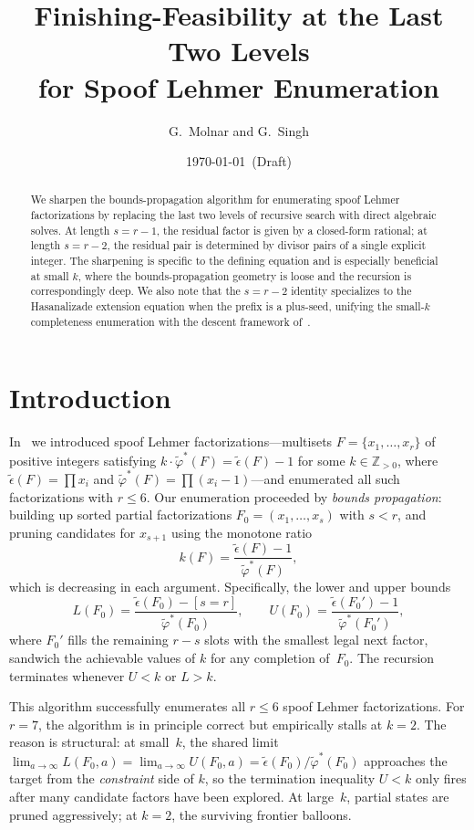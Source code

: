 \documentclass[11pt]{article}
\title{Finishing-Feasibility at the Last Two Levels\\
for Spoof Lehmer Enumeration}
\author{G.~Molnar and G.~Singh}
\date{\today~(Draft)}
\theoremstyle{definition}
\theoremstyle{remark}
\newcommand{\eps}{\tilde{\epsilon}}
\newcommand{\phist}{\tilde{\varphi}^*}
\newcommand{\Z}{\mathbb{Z}}
\begin{document}
\maketitle

\begin{abstract}
We sharpen the bounds-propagation algorithm for enumerating spoof Lehmer
factorizations by replacing the last two levels of recursive search with
direct algebraic solves.  At length $s = r - 1$, the residual factor is
given by a closed-form rational; at length $s = r - 2$, the residual pair
is determined by divisor pairs of a single explicit integer.  The
sharpening is specific to the defining equation and is especially
beneficial at small $k$, where the bounds-propagation geometry is loose
and the recursion is correspondingly deep.  We also note that the
$s = r - 2$ identity specializes to the Hasanalizade extension equation
when the prefix is a plus-seed, unifying the small-$k$ completeness
enumeration with the descent framework of~\cite{MFT}.
\end{abstract}

\section{Introduction}

In~\cite{MS26} we introduced spoof Lehmer factorizations---multisets
$F = \{x_1, \ldots, x_r\}$ of positive integers satisfying
$k \cdot \phist(F) = \eps(F) - 1$ for some $k \in \Z_{>0}$, where
$\eps(F) = \prod x_i$ and $\phist(F) = \prod(x_i - 1)$---and
enumerated all such factorizations with $r \le 6$.  Our enumeration
proceeded by \emph{bounds propagation}: building up sorted partial
factorizations $F_0 = (x_1, \ldots, x_s)$ with $s < r$, and pruning
candidates for $x_{s+1}$ using the monotone ratio
\begin{equation}\label{eq:ratio}
  k(F) = \frac{\eps(F) - 1}{\phist(F)},
\end{equation}
which is decreasing in each argument.  Specifically, the lower and upper
bounds
\[
  L(F_0) = \frac{\eps(F_0) - [s = r]}{\phist(F_0)},
  \qquad
  U(F_0) = \frac{\eps(F_0') - 1}{\phist(F_0')},
\]
where $F_0'$ fills the remaining $r - s$ slots with the smallest legal
next factor, sandwich the achievable values of $k$ for any completion
of~$F_0$.  The recursion terminates whenever $U < k$ or $L > k$.

This algorithm successfully enumerates all $r \le 6$ spoof Lehmer
factorizations.  For $r = 7$, the algorithm is in principle correct but
empirically stalls at $k = 2$.  The reason is structural: at small~$k$,
the shared limit $\lim_{a \to \infty} L(F_0, a) = \lim_{a \to \infty}
U(F_0, a) = \eps(F_0)/\phist(F_0)$ approaches the target from the
\emph{constraint} side of $k$, so the termination inequality $U < k$ only
fires after many candidate factors have been explored.  At large~$k$,
partial states are pruned aggressively; at $k = 2$, the surviving
frontier balloons.
\end{document}
